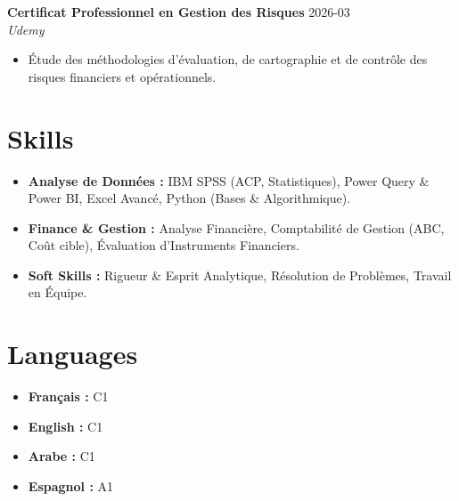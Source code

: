 \documentclass[10pt,a4paper]{article}
\begin{document}
\vspace{4pt}

\textbf{Certificat Professionnel en Gestion des Risques} \hfill 2026-03 \\
\textit{Udemy}
\begin{itemize}
    \item Étude des méthodologies d'évaluation, de cartographie et de contrôle des risques financiers et opérationnels.
\end{itemize}

\section*{Skills}
\begin{itemize}
    \item \textbf{Analyse de Données :} IBM SPSS (ACP, Statistiques), Power Query \& Power BI, Excel Avancé, Python (Bases \& Algorithmique).
    \item \textbf{Finance \& Gestion :} Analyse Financière, Comptabilité de Gestion (ABC, Coût cible), Évaluation d'Instruments Financiers.
    \item \textbf{Soft Skills :} Rigueur \& Esprit Analytique, Résolution de Problèmes, Travail en Équipe.
\end{itemize}

\section*{Languages}
\begin{itemize}
    \item \textbf{Français :} C1
    \item \textbf{English :} C1
    \item \textbf{Arabe :} C1
    \item \textbf{Espagnol :} A1
\end{itemize}
\end{document}
